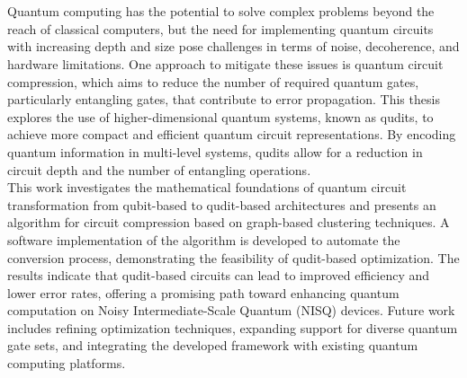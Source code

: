 \chapter*{\abstractname}
Quantum computing has the potential to solve complex problems beyond the reach of classical computers, but the need for implementing quantum circuits with increasing depth and size pose challenges in terms of noise, decoherence, and hardware limitations. One approach to mitigate these issues is quantum circuit compression, which aims to reduce the number of required quantum gates, particularly entangling gates, that contribute to error propagation. This thesis explores the use of higher-dimensional quantum systems, known as qudits, to achieve more compact and efficient quantum circuit representations. By encoding quantum information in multi-level systems, qudits allow for a reduction in circuit depth and the number of entangling operations.
\\[12pt]
This work investigates the mathematical foundations of quantum circuit transformation from qubit-based to qudit-based architectures and presents an algorithm for circuit compression based on graph-based clustering techniques. A software implementation of the algorithm is developed to automate the conversion process, demonstrating the feasibility of qudit-based optimization. The results indicate that qudit-based circuits can lead to improved efficiency and lower error rates, offering a promising path toward enhancing quantum computation on Noisy Intermediate-Scale Quantum (NISQ) devices. Future work includes refining optimization techniques, expanding support for diverse quantum gate sets, and integrating the developed framework with existing quantum computing platforms.
\newpage